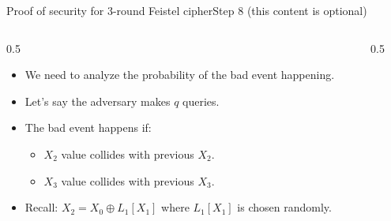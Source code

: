 \ifdefined\PRESENTATION\else\PassOptionsToClass{handout}{beamer}\fi\documentclass[aspectratio=169, lualatex]{beamer}
\begin{document}
	\begin{frame}{Proof of security for 3-round Feistel cipher}{Step 8 (this content is optional)}
		\begin{columns}[c]
			\begin{column}{0.5\textwidth}
				\begin{itemize}
					\item We need to analyze the probability of the bad event happening.
					\item Let's say the adversary makes $q$ queries.
					\item The bad event happens if:
					      \begin{itemize}
						      \item $X_2$ value collides with previous $X_2$.
						      \item $X_3$ value collides with previous $X_3$.
					      \end{itemize}
					\item Recall: $X_2 = X_0 \oplus L_1[X_1]$ where $L_1[X_1]$ is chosen randomly.
				\end{itemize}
			\end{column}
			\begin{column}{0.5\textwidth}
				\vspace{-1.5cm}
				\begin{center}
				\end{center}
			\end{column}
		\end{columns}
	\end{frame}
\end{document}
